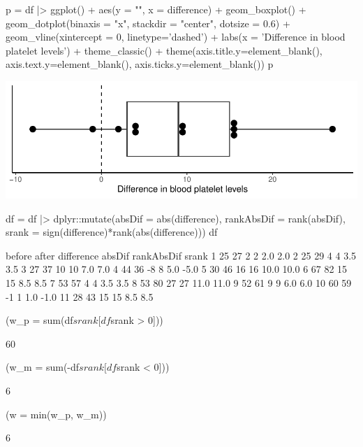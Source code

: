 \documentclass[a4paper]{article}
\begin{document}
\begin{Schunk}
\begin{Sinput}
p = df |> ggplot() +
  aes(y = "", x = difference) + 
  geom_boxplot() +
  geom_dotplot(binaxis = "x", stackdir = "center", dotsize = 0.6) +
  geom_vline(xintercept = 0, linetype='dashed') +
  labs(x = 'Difference in blood platelet levels') +
  theme_classic() +
  theme(axis.title.y=element_blank(),
        axis.text.y=element_blank(),
        axis.ticks.y=element_blank())
p
\end{Sinput}


{\centering \includegraphics[width=\maxwidth]{figure/listings-unnamed-chunk-113-1} 

}

\begin{Sinput}
df = df |> dplyr::mutate(absDif = abs(difference),
                          rankAbsDif = rank(absDif),
                          srank = sign(difference)*rank(abs(difference)))
df
\end{Sinput}
\begin{Soutput}
   before after difference absDif rankAbsDif srank
1      25    27          2      2        2.0   2.0
2      25    29          4      4        3.5   3.5
3      27    37         10     10        7.0   7.0
4      44    36         -8      8        5.0  -5.0
5      30    46         16     16       10.0  10.0
6      67    82         15     15        8.5   8.5
7      53    57          4      4        3.5   3.5
8      53    80         27     27       11.0  11.0
9      52    61          9      9        6.0   6.0
10     60    59         -1      1        1.0  -1.0
11     28    43         15     15        8.5   8.5
\end{Soutput}
\begin{Sinput}
(w_p = sum(df$srank[df$srank > 0]))
\end{Sinput}
\begin{Soutput}
[1] 60
\end{Soutput}
\begin{Sinput}
(w_m = sum(-df$srank[df$srank < 0]))
\end{Sinput}
\begin{Soutput}
[1] 6
\end{Soutput}
\begin{Sinput}
(w = min(w_p, w_m))
\end{Sinput}
\begin{Soutput}
[1] 6
\end{Soutput}
\end{Schunk}
\end{document}
